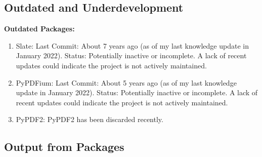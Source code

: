 \subsection{Outdated and Underdevelopment}

\textbf{Outdated Packages:}
\begin{enumerate}
\item Slate:
Last Commit: About 7 years ago (as of my last knowledge update in January 2022).
Status: Potentially inactive or incomplete. A lack of recent updates could indicate the project is not actively maintained.
\item PyPDFium:
Last Commit: About 5 years ago (as of my last knowledge update in January 2022).
Status: Potentially inactive or incomplete. A lack of recent updates could indicate the project is not actively maintained.
\item PyPDF2: PyPDF2 has been discarded recently.
\end{enumerate}



\subsection{Output from Packages}



